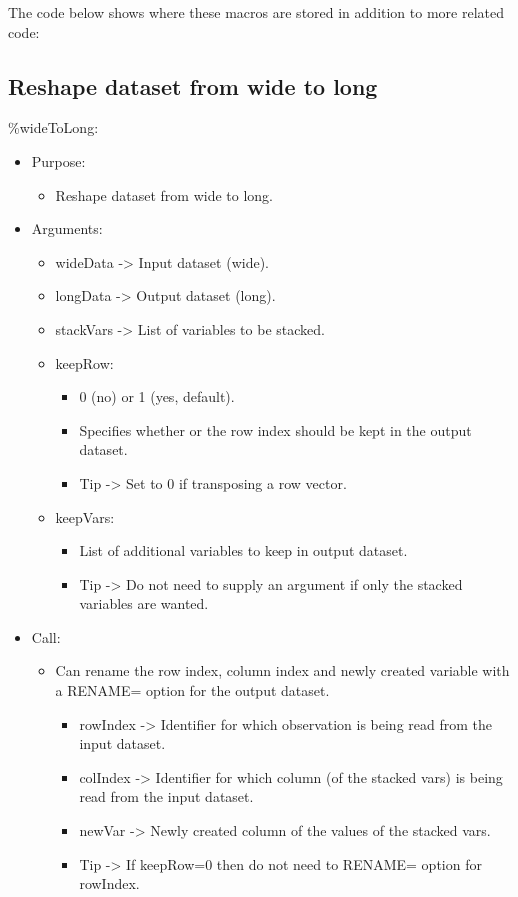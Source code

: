 \documentclass[11pt, oneside]{article}
\begin{document}
The code below shows where these macros are stored in addition to more related code:


\subsection{Reshape dataset from wide to long}

\%wideToLong:
\begin{itemize}
\item Purpose:
	\begin{itemize}
	\item Reshape dataset from wide to long.
	\end{itemize}
\item Arguments:
	\begin{itemize}
	\item wideData -> Input dataset (wide).
	\item longData -> Output dataset (long).
	\item stackVars -> List of variables to be stacked.
	\item keepRow:
		\begin{itemize}
		\item 0 (no) or 1 (yes, default).
		\item Specifies whether or the row index should be kept in the output dataset.
		\item Tip -> Set to 0 if transposing a row vector.
		\end{itemize}
	\item keepVars:
		\begin{itemize}
		\item List of additional variables to keep in output dataset.
		\item Tip -> Do not need to supply an argument if only the stacked variables are wanted.
		\end{itemize}
	\end{itemize}
\item Call:
	\begin{itemize}
	\item Can rename the row index, column index and newly created variable with a RENAME= option for the output dataset.
		\begin{itemize}
		\item rowIndex -> Identifier for which observation is being read from the input dataset.
		\item colIndex -> Identifier for which column (of the stacked vars) is being read from the input dataset.
		\item newVar -> Newly created column of the values of the stacked vars.
		\item Tip -> If keepRow=0 then do not need to RENAME= option for rowIndex.
		\end{itemize}
	\end{itemize}
\end{itemize}
\end{document}
